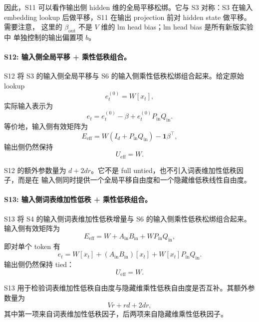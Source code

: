 因此，S11 可以看作输出侧 hidden 维的全局平移松绑。它与 S3 对称：S3 在输入
embedding lookup 后做平移，S11 在输出 projection 前对 hidden state 做平移。需要注意，
这里的 $\beta_{\mathrm{out}}$ 不是 $V$ 维的 lm head bias；lm head bias 是所有新版实验中
单独控制的输出偏置项 $b$。

\paragraph{S12: 输入侧全局平移 + 乘性低秩组合。}
S12 将 S3 的输入侧全局平移与 S6 的输入侧乘性低秩松绑组合起来。给定原始 lookup
\begin{equation}
    e_t^{(0)} = W[x_t],
\end{equation}
实际输入表示为
\begin{equation}
    e_t = e_t^{(0)}-\beta + e_t^{(0)}P_{\mathrm{in}}Q_{\mathrm{in}}.
\end{equation}
等价地，输入侧有效矩阵为
\begin{equation}
    E_{\mathrm{eff}} =
    W(I_d+P_{\mathrm{in}}Q_{\mathrm{in}})-\mathbf{1}\beta^\top,
\end{equation}
输出侧仍然保持
\begin{equation}
    U_{\mathrm{eff}} = W.
\end{equation}

S12 的额外参数量为 $d+2dr$。它不是 full untied，也不引入词表维加性低秩因子，而是在
输入侧同时提供一个全局平移自由度和一个隐藏维低秩线性自由度。

\paragraph{S13: 输入侧词表维加性低秩 + 乘性低秩组合。}
S13 将 S4 的输入侧词表维加性低秩增量与 S6 的输入侧乘性低秩松绑组合起来。输入侧有效矩阵为
\begin{equation}
    E_{\mathrm{eff}} =
    W + A_{\mathrm{in}}B_{\mathrm{in}} + WP_{\mathrm{in}}Q_{\mathrm{in}},
\end{equation}
即对单个 token 有
\begin{equation}
    e_t =
    W[x_t] + \left(A_{\mathrm{in}}B_{\mathrm{in}}\right)[x_t]
    + W[x_t]P_{\mathrm{in}}Q_{\mathrm{in}}.
\end{equation}
输出侧仍然保持 tied：
\begin{equation}
    U_{\mathrm{eff}} = W.
\end{equation}

S13 用于检验词表维加性低秩自由度与隐藏维乘性低秩自由度是否互补。其额外参数量为
\begin{equation}
    Vr + rd + 2dr,
\end{equation}
其中第一项来自词表维加性低秩因子，后两项来自隐藏维乘性低秩因子。

